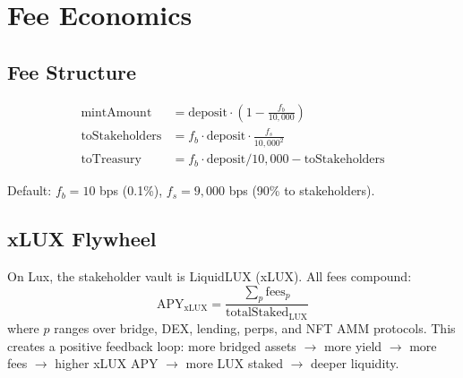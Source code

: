 \section{Fee Economics}

\label{sec:economics}

\subsection{Fee Structure}

\begin{align}
  \text{mintAmount} &= \text{deposit} \cdot \left(1 - \frac{f_b}{10{,}000}\right) \\
  \text{toStakeholders} &= f_b \cdot \text{deposit} \cdot \frac{f_s}{10{,}000^2} \\
  \text{toTreasury} &= f_b \cdot \text{deposit} / 10{,}000 - \text{toStakeholders}
\end{align}

Default: $f_b = 10$ bps (0.1\%), $f_s = 9{,}000$ bps (90\% to stakeholders).

\subsection{xLUX Flywheel}

On Lux, the stakeholder vault is LiquidLUX (xLUX). All fees compound:
\begin{equation}
  \text{APY}_{\text{xLUX}} = \frac{\sum_p \text{fees}_p}{\text{totalStaked}_{\text{LUX}}}
\end{equation}
where $p$ ranges over bridge, DEX, lending, perps, and NFT AMM protocols. This creates a positive feedback loop: more bridged assets $\to$ more yield $\to$ more fees $\to$ higher xLUX APY $\to$ more LUX staked $\to$ deeper liquidity.

